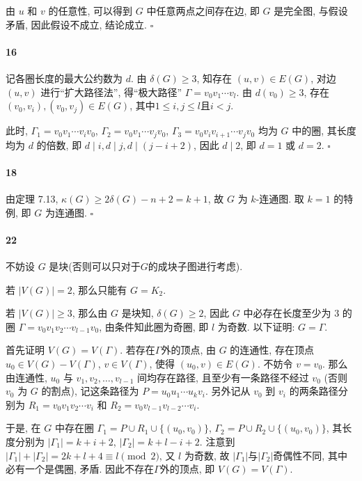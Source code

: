 \documentclass{ctexart}
\def\QED{\hfill $\square$}
\begin{document}
由 $u$ 和 $v$ 的任意性, 可以得到 $G$ 中任意两点之间存在边,
即 $G$ 是完全图, 与假设矛盾, 因此假设不成立, 结论成立. \QED

\paragraph*{16} 记各圈长度的最大公约数为 $d$. 由 $\delta(G)\ge 3$, 
知存在 $(u,v)\in E(G)$, 对边 $(u,v)$ 进行``扩大路径法'', 
得``极大路径'' $\Gamma=v_0v_1\cdots v_l$.
由 $d(v_0)\ge 3$, 存在 $(v_0,v_i),(v_0,v_j)\in E(G)$, 
其中$1\le i,j\le l$且$i<j$.

此时, $\Gamma_1=v_0v_1\cdots v_iv_0$,
$\Gamma_2=v_0v_1\cdots v_jv_0$,
$\Gamma_3=v_0v_iv_{i+1}\cdots v_jv_0$ 均为 $G$ 中的圈,
其长度均为 $d$ 的倍数, 即 $d\mid i, d\mid j, d\mid(j-i+2)$, 
因此 $d\mid 2$, 即 $d=1$ 或 $d=2$. \QED


\paragraph*{18} 由定理 7.13, $\kappa(G) \ge 2\delta(G)-n+2=k+1$,
故 $G$ 为 $k$-连通图. 取 $k=1$ 的特例, 即 $G$ 为连通图. \QED

\paragraph*{22} 不妨设 $G$ 是块(否则可以只对于$G$的成块子图进行考虑).

若 $|V(G)| =2$, 那么只能有 $G=K_2$. 

若 $|V(G)|\ge 3$, 那么由 $G$ 是块知, $\delta(G)\ge 2$, 
因此 $G$ 中必存在长度至少为 3 的圈 $\Gamma=v_0v_1v_2\cdots v_{l-1}v_0$, 
由条件知此圈为奇圈, 即 $l$ 为奇数. 以下证明: $G=\Gamma$.

首先证明 $V(G)=V(\Gamma)$. 若存在$\Gamma$外的顶点, 
由 $G$ 的连通性, 存在顶点 $u_0\in V(G)-V(\Gamma)$, $v\in V(\Gamma)$, 
使得 $(u_0,v)\in E(G)$. 不妨令 $v=v_0$. 
那么由连通性, $u_0$ 与 $v_1,v_2,\ldots,v_{l-1}$ 间均存在路径,
且至少有一条路径不经过 $v_0$ (否则 $v_0$ 为 $G$ 的割点), 
记这条路径为 $P=u_0u_1\cdots u_kv_i$.
另外记从 $v_0$ 到 $v_i$ 的两条路径分别为
$R_1=v_0v_1v_2\cdots v_i$ 和 $R_2=v_0v_{l-1}v_{l-2}\cdots v_i$.

于是, 在 $G$ 中存在圈 $\Gamma_1=P\cup R_1\cup \{(u_0,v_0)\}$, 
$\Gamma_2=P\cup R_2\cup \{(u_0,v_0)\}$,
其长度分别为 $|\Gamma_1| = k+i+2$, $|\Gamma_2| = k+l-i+2$.
注意到 $|\Gamma_1|+|\Gamma_2| = 2k+l+4\equiv l \pmod 2$,
又 $l$ 为奇数, 故 $|\Gamma_1|$与$|\Gamma_2|$奇偶性不同,
其中必有一个是偶圈, 矛盾. 因此不存在$\Gamma$外的顶点, 
即 $V(G)=V(\Gamma)$.
\end{document}
